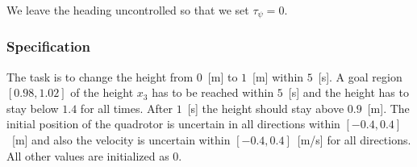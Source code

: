 \documentclass[EPiC]{easychair}
\begin{document}
We leave the heading uncontrolled so that we set $\tau_\psi = 0$.

\subsubsection{Specification}

The task is to change the height from $0$~[m] to $1$~[m] within $5$~[s]. A goal region $[0.98,1.02]$ of the height $x_3$ has to be reached within $5$~[s] and the height has to stay below $1.4$ for all times. After $1$~[s] the height should stay above $0.9$~[m]. The initial position of the quadrotor is uncertain in all directions within $[-0.4,0.4]$~[m] and also the velocity is uncertain within $[-0.4,0.4]$~[m/s] for all directions. All other values are initialized as $0$.

\end{document}
